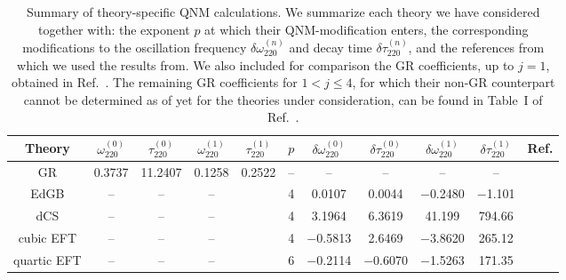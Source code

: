 \documentclass[twocolumn,
               prd,
               aps,
               superscriptaddress,
               tightenlines,
               nofootinbib,
               eqsecnum,
               amsfonts,
               amsmath,
               longbibliography]{revtex4-1}
\begin{document}
\begin{table}[t]
\begin{tabular}{c | c c c c c c c c c c}
\hline
\hline
Theory      & $\omega^{(0)}_{220}$ & $\tau^{(0)}_{220}$ & $\omega^{(1)}_{220}$ & $\tau^{(1)}_{220}$ & $p$ & $\delta \omega^{(0)}_{220}$ & $\delta \tau^{(0)}_{220}$ & $\delta \omega^{(1)}_{220}$ & $\delta \tau^{(1)}_{220}$ & Ref.  \\
\hline
GR          & 0.3737               & 11.2407            &  0.1258              & 0.2522             & --  & --                          & --                        & --                          & --                        & \cite{Maselli:2019mjd} \\
\hline
EdGB        & --                   & --                 &  --                  &                    & 4   & 0.0107                      & 0.0044                    & $-$0.2480                   & $-$1.101                  & \cite{Pani:2009wy,Blazquez-Salcedo:2016enn,Pierini:2021jxd} \\
dCS         & --                   & --                 &  --                  &                    & 4   & 3.1964                      & 6.3619                    & 41.199                      & 794.66                    & \cite{Wagle:2021tam}  \\
cubic EFT   & --                   & --                 &  --                  &                    & 4   & $-$0.5813                   & 2.6469                    & $-$3.8620                   & 265.12                    & \cite{Cano:2021myl} \\
quartic EFT & --                   & --                 &  --                  &                    & 6   & $-$0.2114                   & $-$0.6070                 & $-$1.5263                   & 171.35                    & \cite{Cano:2021myl}  \\
\hline
\hline
\end{tabular}
\caption{Summary of theory-specific QNM calculations.
%
We summarize each theory we have considered together with: the exponent $p$ at
which their QNM-modification enters, the corresponding modifications to the
oscillation frequency $\delta \omega^{(n)}_{220}$ and decay time $\delta \tau^{(n)}_{220}$, and the
references from which we used the results from.
%
We also included for comparison the GR coefficients, up to $j=1$, obtained in Ref.~\cite{Maselli:2019mjd}.
%
The remaining GR coefficients for $1< j \leqslant 4$, for which their non-GR counterpart cannot be determined as of yet for
the theories under consideration, can be found in Table~I of Ref.~\cite{Maselli:2019mjd}.
}
\label{tab:ref_theories_qnms}
\end{table}
\end{document}

